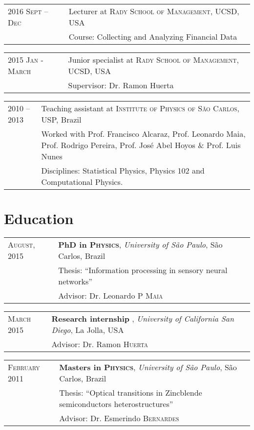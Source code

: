 \documentclass[letter,10pt]{article} %
\begin{document}
\begin{tabular}{p{3.2cm}|p{11cm}}
  \textsc{2016 Sept -- Dec} & Lecturer at \textsc{Rady School of Management}, UCSD, USA \emph{}\\
  & \footnotesize{Course: Collecting and Analyzing Financial Data}
\end{tabular}

\begin{tabular}{p{3.2cm}|p{11cm}}
  \textsc{2015 Jan - March} & Junior specialist at \textsc{Rady School of Management}, UCSD, USA \emph{}\\
  & \footnotesize{Supervisor: Dr. Ramon Huerta}
\end{tabular}

\begin{tabular}{p{3.2cm}|p{11cm}}
  \textsc{2010 -- 2013} & Teaching assistant at \textsc{Institute of Physics of S\~ao Carlos}, USP, Brazil\\
  & \footnotesize{Worked with Prof. Francisco Alcaraz, Prof. Leonardo Maia, Prof. Rodrigo Pereira, Prof. Jos\'e Abel Hoyos \& Prof. Luis Nunes}\\
  & \footnotesize{Disciplines: Statistical Physics, Physics 102 and Computational Physics.}
\end{tabular}


\section{Education}

\begin{tabular}{p{3.2cm}|p{11cm}}
  \textsc{August}, 2015 & {\bf PhD in \textsc{Physics}}, \textit{University of S\~ao Paulo}, S\~ao Carlos, Brazil\\
    & Thesis: ``Information processing in sensory neural networks'' \\
    & \small Advisor: Dr. Leonardo P \textsc{Maia} \\
\end{tabular}

\begin{tabular}{p{3.2cm}|p{11cm}}
  \textsc{March} 2015 & {\bf Research internship }, \textit{University of California San Diego}, La Jolla, USA \\
  & \small Advisor: Dr. Ramon \textsc{Huerta} \\
\end{tabular}

\begin{tabular}{p{3.2cm}|p{12cm}}
  \textsc{February} 2011 & {\bf Masters in \textsc{Physics}}, \textit{University of S\~ao Paulo}, S\~ao Carlos, Brazil\\
  & Thesis: ``Optical transitions in Zincblende semiconductors heterostructures'' \\
  & \small Advisor: Dr. Esmerindo \textsc{Bernardes} \\
\end{tabular}
\end{document}
